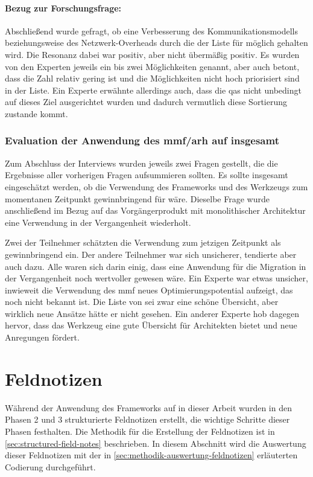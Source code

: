 \paragraph{Bezug zur Forschungsfrage:} Abschließend wurde gefragt, ob eine Verbesserung des Kom\-mu\-ni\-ka\-ti\-ons\-mo\-dells beziehungsweise des Netzwerk-Overheads durch die \bpp der Liste für möglich gehalten wird.
Die Resonanz dabei war positiv, aber nicht übermäßig positiv.
Es wurden von den Experten jeweils ein bis zwei Möglichkeiten genannt, aber auch betont, dass die Zahl relativ gering ist und die Möglichkeiten nicht hoch priorisiert sind in der Liste.
Ein Experte erwähnte allerdings auch, dass die \glspl{qa} nicht unbedingt auf dieses Ziel ausgerichtet wurden und dadurch vermutlich diese Sortierung zustande kommt.

\subsubsection{Evaluation der Anwendung des \gls{mmf}/\gls{arh} auf \jf insgesamt}
\label{sec:evaluation-mmf-anwendung-insgesamt}

Zum Abschluss der Interviews wurden jeweils zwei Fragen gestellt, die die Ergebnisse aller vor\-he\-ri\-gen Fragen aufsummieren sollten.
Es sollte insgesamt eingeschätzt werden, ob die Verwendung des Frameworks und des Werkzeugs zum momentanen Zeitpunkt gewinnbringend für \jf wäre.
Dieselbe Frage wurde anschließend im Bezug auf das Vorgängerprodukt mit monolithischer Architektur eine Verwendung in der Vergangenheit wiederholt.

Zwei der Teilnehmer schätzten die Verwendung zum jetzigen Zeitpunkt als gewinnbringend ein.
Der andere Teilnehmer war sich unsicherer, tendierte aber auch dazu.
Alle waren sich darin einig, dass eine Anwendung für die Migration in der Vergangenheit noch wertvoller gewesen wäre.
Ein Experte war etwas unsicher, inwieweit die Verwendung des \gls{mmf} neues Optimierungspotential aufzeigt, das noch nicht bekannt ist.
Die Liste von \bpp sei zwar eine schöne Übersicht, aber wirklich neue Ansätze hätte er nicht gesehen.
Ein anderer Experte hob dagegen hervor, dass das Werkzeug eine gute Übersicht für Architekten bietet und neue Anregungen fördert.

\section{Feldnotizen}
\label{sec:auswertung-feldnotizen}

Während der Anwendung des Frameworks auf \jf in dieser Arbeit wurden in den Phasen 2 und 3 strukturierte Feldnotizen erstellt, die wichtige Schritte dieser Phasen festhalten.
Die Methodik für die Erstellung der Feldnotizen ist in \cref{sec:structured-field-notes} beschrieben.
In diesem Abschnitt wird die Auswertung dieser Feldnotizen mit der in \cref{sec:methodik-auswertung-feldnotizen} erläuterten Codierung  durchgeführt.

